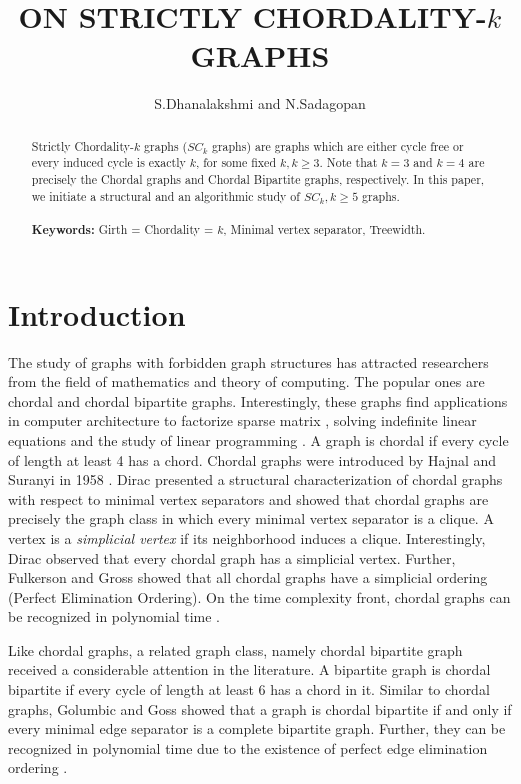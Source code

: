 \documentclass[runningheads]{llncs}
\date{}
\title{ON STRICTLY CHORDALITY-$k$ GRAPHS}
\author{ S.Dhanalakshmi and N.Sadagopan }
\institute{Indian Institute of Information Technology, Design and Manufacturing, Kancheepuram, Chennai, India. \\
\email{$\{mat12d001,sadagopan\}@iiitdm.ac.in$}}
\begin{document}
\maketitle
{}
\pagestyle{plain}




\begin{abstract}
Strictly Chordality-$k$ graphs ($SC_k$ graphs) are graphs which are either cycle free or every induced cycle is exactly $k$, for some fixed $k, k \geq3$. Note that $k = 3$ and $k = 4$ are precisely the Chordal graphs and Chordal Bipartite graphs, respectively. In this paper, we initiate a structural and an algorithmic study of $SC_k, k \geq 5$ graphs. 
\\ \\
\textbf{Keywords:} Girth = Chordality = $k$, Minimal vertex separator, Treewidth.
\end{abstract}


\section{Introduction}
The study of graphs with forbidden graph structures has attracted researchers from the field of mathematics and theory of computing. The popular ones are chordal and chordal bipartite graphs. Interestingly, these graphs find applications in computer architecture to factorize sparse matrix \cite{app1}, solving indefinite linear equations \cite{app2} and the study of linear programming \cite{app3}. A graph is chordal if every cycle of length at least 4 has a chord. Chordal graphs were introduced by Hajnal and Suranyi in 1958 \cite{Hajnal}. Dirac \cite{dirac} presented a structural characterization of chordal graphs with respect to minimal vertex separators and showed that chordal graphs are precisely the graph class in which every minimal vertex separator is a clique. A vertex is a \emph{simplicial vertex} if its neighborhood induces a clique. Interestingly, Dirac observed that every chordal graph has a simplicial vertex. Further, Fulkerson and Gross \cite{fulkerson} showed that all chordal graphs have a simplicial ordering (Perfect Elimination Ordering). On the time complexity front, chordal graphs can be recognized in polynomial time \cite{fulkerson,tarjan}.

Like chordal graphs, a related graph class, namely chordal bipartite graph received a considerable attention in the literature. A bipartite graph is chordal bipartite if every cycle of length at least 6 has a chord in it. Similar to chordal graphs, Golumbic and Goss \cite{GolumbicGoss} showed that a graph is chordal bipartite if and only if every minimal edge separator is a complete bipartite graph. Further, they can be recognized in polynomial time due to the existence of perfect edge elimination ordering \cite{GolumbicGoss}.
\end{document}

